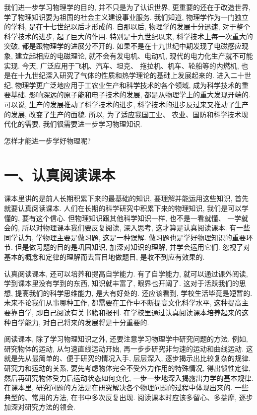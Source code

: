\documentclass[10pt]{article}
\begin{document}
我们进一步学习物理学的目的, 并不只是为了认识世界, 更重要的还在于改造世界, 学了物理知识要为祖国的社会主义建设事业服务. 我们知道, 物理学作为一门独立的学科, 是在十七世纪以后才形成的. 自那以后, 物理学的发展十分迅速, 对于整个科学技术的进步, 起了巨大的作用. 特别是十九世纪以来, 科学技术上每一次重大的突破, 都是跟物理学的进展分不开的. 如果不是在十九世纪中期发现了电磁感应现象, 建立起相应的电磁理论, 就不会有发电机、电动机, 现代的电力化生产就不可能实现. 今天, 广泛应用于飞机、汽车、坦克、 拖拉机、机车、轮船等的内燃机, 也是在十九世纪深入研究了气体的性质和热学理论的基础上发展起来的. 进入二十世纪, 物理学更广泛地应用于工农业生产和科学技术的各个领域, 成为科学技术的重要基础. 影响深远的原子能和电子技术的发展, 都是从物理学上的重大发现开端的. 可以说, 生产的发展推动了科学技术的进步, 科学技术的进步反过来又推动了生产的发展, 改变了生产的面貌. 所以, 为了适应我国工业、 农业、国防和科学技术现代化的需要, 我们很需要进一步学习物理知识.

怎样才能进一步学好物理呢?

\section*{一、认真阅读课本}

课本里讲的是前人长期积累下来的最基础的知识, 要理解并能运用这些知识, 首先就要认真阅读课本. 人们在长期的科学研究中积累下来的物理知识, 我们是可以学懂的, 要有这个信心. 但物理知识跟其他科学知识一样, 也不是一看就懂、 一学就会的, 所以对物理课本我们要反复阅读, 深入思考, 这才算是认真阅读课本. 有一些同学认为, 学物理主要是做习题, 这是一种误解. 做习题也是学好物理知识的重要环节. 但是做习题的目的是巩固知识, 加深对知识的理解, 并学会运用它们. 忽视了对基本的概念和定律的理解而去盲目地做题目, 是收不到应有效果的.

认真阅读课本, 还可以培养和提高自学能力. 有了自学能力, 就可以通过课外阅读, 学到课本里没有学到的东西, 知识就丰富了, 眼界也开阔了. 这对于活跃我们的思想, 提高我们的科学思维能力, 是大有好处的. 还应该看到, 学校生活毕竟是短暂的. 未来不论我们从事哪种工作, 都需要在工作中不断提高文化科学水平, 这种提高主要靠自学, 即自己阅读有关书籍和报刊. 在学校里通过认真阅读课本培养起来的这种自学能力, 对自己将来的发展将是十分重要的.

阅读课本, 除了学习物理知识之外, 还要注意学习物理学中研究问题的方法. 例如, 研究物体的运动, 从匀速直线运动开始, 再一步步研究非匀速的运动和曲线运动. 这就是先从最简单的、便于研究的情况入手, 层层深入, 逐步揭示出比较复杂的规律. 研究力和运动的关系, 要先考虑物体完全不受外力作用的特殊情况, 得出惯性定律, 然后再研究物体受力后运动状态如何变化, 一步一步地深入揭露出力学的基本规律. 在课本里, 研究问题的方法是在研究解决各个物理问题的过程中体现出来的. 一些典型的、常用的方法, 在书中多次反复出现. 阅读课本时应该多留心、多揣摩, 逐步加深对研究方法的领会.
\end{document}
